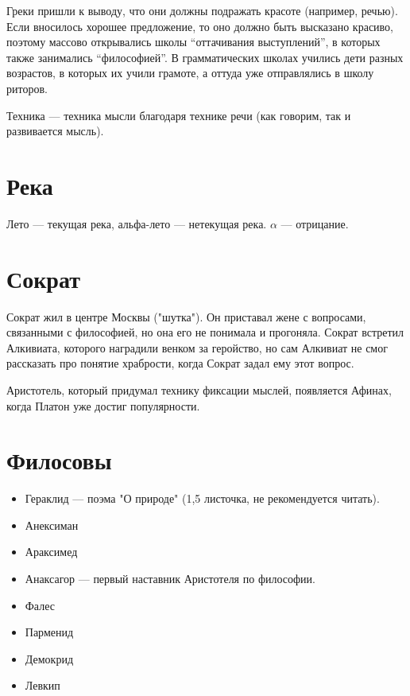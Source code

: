 \documentclass{article}
\begin{document}
Греки пришли к выводу, что они должны подражать красоте (например, речью).
Если вносилось хорошее предложение, то оно должно быть высказано красиво, 
поэтому массово открывались школы ``оттачивания выступлений'', в которых также занимались ``философией''.
В грамматических школах учились дети разных возрастов, в которых их учили грамоте, а оттуда уже отправлялись в школу риторов.

Техника --- техника мысли благодаря технике речи (как говорим, так и развивается мысль).



\section{Река}
Лето --- текущая река, альфа-лето --- нетекущая река. $\alpha$ --- отрицание.



\section{Сократ}
Сократ жил в центре Москвы ("шутка"). 
Он приставал жене с вопросами, связанными с философией, но она его не понимала и прогоняла.
Сократ встретил Алкивиата, которого наградили венком за геройство, но сам Алкивиат не смог рассказать 
про понятие храбрости, когда Сократ задал ему этот вопрос.

Аристотель, который придумал технику фиксации мыслей, появляется Афинах, когда Платон уже достиг популярности.



\section{Филосовы}
\begin{itemize}
    \item Гераклид --- поэма "О природе" (1,5 листочка, не рекомендуется читать).
    \item Анексиман
    \item Араксимед
    \item Анаксагор --- первый наставник Аристотеля по философии.
    \item Фалес
    \item Парменид
    \item Демокрид
    \item Левкип
\end{itemize}
\end{document}
